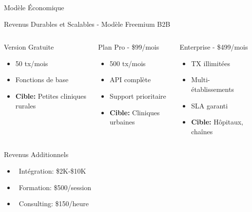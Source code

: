 \documentclass[aspectratio=169,11pt]{beamer}
\begin{document}
\begin{frame}{Modèle Économique}

\begin{block}{Revenus Durables et Scalables - Modèle Freemium B2B}
\vspace{0.2cm}

\begin{columns}[T]
\begin{exampleblock}{Version Gratuite}
\small
\begin{itemize}
    \item 50 tx/mois
    \item Fonctions de base
    \item \textbf{Cible:} Petites cliniques rurales
\end{itemize}
\end{exampleblock}

\begin{exampleblock}{Plan Pro - \$99/mois}
\small
\begin{itemize}
    \item 500 tx/mois
    \item API complète
    \item Support prioritaire
    \item \textbf{Cible:} Cliniques urbaines
\end{itemize}
\end{exampleblock}

\begin{exampleblock}{Enterprise - \$499/mois}
\small
\begin{itemize}
    \item TX illimitées
    \item Multi-établissements
    \item SLA garanti
    \item \textbf{Cible:} Hôpitaux, chaînes
\end{itemize}
\end{exampleblock}
\end{columns}
\end{block}

\vspace{0.3cm}

\begin{columns}[T]
\begin{block}{Revenus Additionnels}
\small
\begin{itemize}
    \item \faCogs~Intégration: \$2K-\$10K
    \item \faChalkboardTeacher~Formation: \$500/session
    \item \faHandshake~Consulting: \$150/heure
\end{itemize}
\end{block}


\end{columns}
\end{frame}
\end{document}
